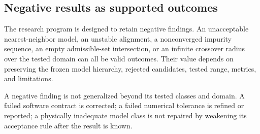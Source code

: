 \subsection{Negative results as supported outcomes}


The research program is designed to retain negative findings. An unacceptable
nearest-neighbor model, an unstable alignment, a nonconverged impurity sequence,
an empty admissible-set intersection, or an infinite crossover radius over the
tested domain can all be valid outcomes. Their value depends on preserving the
frozen model hierarchy, rejected candidates, tested range, metrics, and
limitations.

A negative finding is not generalized beyond its tested classes and domain. A
failed software contract is corrected; a failed numerical tolerance is refined
or reported; a physically inadequate model class is not repaired by weakening
its acceptance rule after the result is known.
